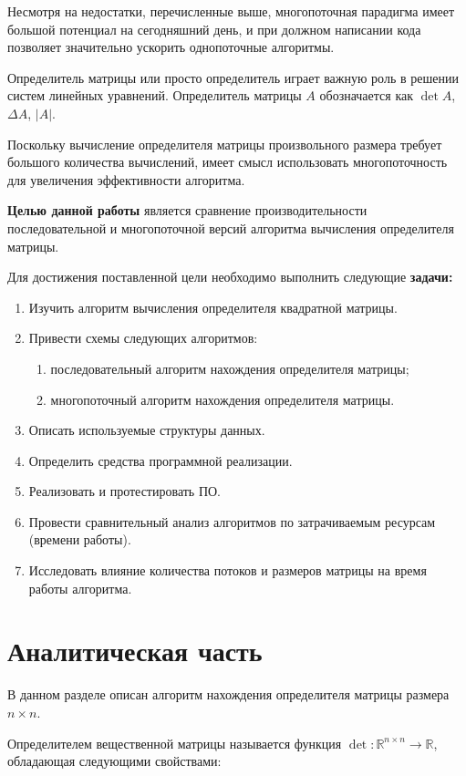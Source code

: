 \documentclass[a4paper,oneside,14pt]{extreport}
\begin{document}
Несмотря на недостатки, перечисленные выше,
многопоточная парадигма имеет большой потенциал на сегодняшний день,
и при должном написании кода позволяет значительно ускорить однопоточные алгоритмы.

Определитель матрицы или просто определитель играет важную роль в решении систем линейных уравнений.
Определитель матрицы $A$ обозначается как $\det A$, $\Delta A$, $|A|$.

Поскольку вычисление определителя матрицы произвольного размера требует большого количества вычислений, имеет смысл использовать многопоточность для увеличения эффективности алгоритма.

\textbf{Целью данной работы} является сравнение производительности последовательной и многопоточной версий алгоритма вычисления определителя матрицы.

Для достижения поставленной цели необходимо выполнить следующие \textbf{задачи:}
\begin{enumerate}
	\item Изучить алгоритм вычисления определителя квадратной матрицы.
	\item Привести схемы следующих алгоритмов:
	\begin{enumerate}
		\item последовательный алгоритм нахождения определителя матрицы;
		\item многопоточный алгоритм нахождения определителя матрицы.
	\end{enumerate}
	\item Описать используемые структуры данных.
	\item Определить средства программной реализации.
	\item Реализовать и протестировать ПО.
	\item Провести сравнительный анализ алгоритмов по затрачиваемым ресурсам (времени работы).
	\item Исследовать влияние количества потоков и размеров матрицы на время работы алгоритма.
\end{enumerate}
\newpage

\chapter{Аналитическая часть}	
В данном разделе описан алгоритм нахождения определителя матрицы размера $n \times n$.

Определителем вещественной матрицы называется функция $\det{}: \mathbb{R}^{n\times n} \rightarrow \mathbb{R}$,
обладающая следующими свойствами:
\end{document}
